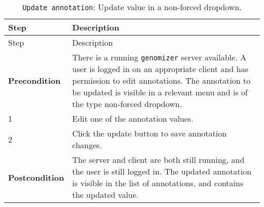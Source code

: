 \begin{longtable}[c]{@{}ll@{}}
\caption{\texttt{Update\ annotation}: Update value in a non-forced
dropdown.}\tabularnewline
\toprule
\begin{minipage}[b]{0.31\columnwidth}\raggedright\strut
Step
\strut\end{minipage} &
\begin{minipage}[b]{0.63\columnwidth}\raggedright\strut
Description
\strut\end{minipage}\tabularnewline
\midrule
\endfirsthead
\toprule
\begin{minipage}[b]{0.31\columnwidth}\raggedright\strut
Step
\strut\end{minipage} &
\begin{minipage}[b]{0.63\columnwidth}\raggedright\strut
Description
\strut\end{minipage}\tabularnewline
\midrule
\endhead
\begin{minipage}[t]{0.31\columnwidth}\raggedright\strut
\textbf{Precondition}
\strut\end{minipage} &
\begin{minipage}[t]{0.63\columnwidth}\raggedright\strut
There is a running \texttt{genomizer} server available. A user is logged
in on an appropriate client and has permission to edit annotations. The
annotation to be updated is visible in a relevant menu and is of the
type non-forced dropdown.
\strut\end{minipage}\tabularnewline
\begin{minipage}[t]{0.31\columnwidth}\raggedright\strut
1
\strut\end{minipage} &
\begin{minipage}[t]{0.63\columnwidth}\raggedright\strut
Edit one of the annotation values.
\strut\end{minipage}\tabularnewline
\begin{minipage}[t]{0.31\columnwidth}\raggedright\strut
2
\strut\end{minipage} &
\begin{minipage}[t]{0.63\columnwidth}\raggedright\strut
Click the update button to save annotation changes.
\strut\end{minipage}\tabularnewline
\begin{minipage}[t]{0.31\columnwidth}\raggedright\strut
\textbf{Postcondition}
\strut\end{minipage} &
\begin{minipage}[t]{0.63\columnwidth}\raggedright\strut
The server and client are both still running, and the user is still
logged in. The updated annotation is visible in the list of annotations,
and contains the updated value.
\strut\end{minipage}\tabularnewline
\bottomrule
\end{longtable}

